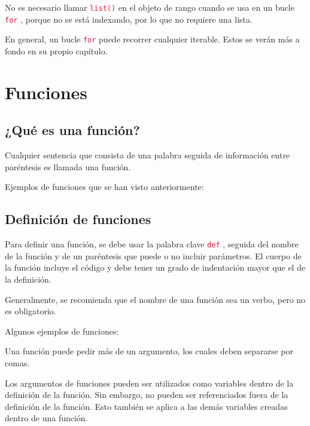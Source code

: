 \documentclass{report}
\newcommand{\ttt}[1]{
  \textcolor{Crimson}{\texttt{#1}}
}
\begin{document}
No es necesario llamar \ttt{list()} en el objeto de rango cuando se usa en un bucle \ttt{for}, porque no se está indexando, por lo que no requiere una lista.\smallskip

En general, un bucle \ttt{for} puede recorrer cualquier iterable. Estos se verán más a fondo en su propio capítulo.

\clearpage\chapter{Funciones}

\section{¿Qué es una función?}

Cualquier sentencia que consista de una palabra seguida de información entre paréntesis es llamada una función.\smallskip

Ejemplos de funciones que se han visto anteriormente:


\section{Definición de funciones}

Para definir una función, se debe usar la palabra clave \ttt{def}, seguida del nombre de la función y de un paréntesis que puede o no incluir parámetros. El cuerpo de la función incluye el código y debe tener un grado de indentación mayor que el de la definición.\smallskip

Generalmente, se recomienda que el nombre de una función sea un verbo, pero no es obligatorio.\smallskip

Algunos ejemplos de funciones:



Una función puede pedir más de un argumento, los cuales deben separarse por comas.



Los argumentos de funciones pueden ser utilizados como variables dentro de la definición de la función. Sin embargo, no pueden ser referenciados fuera de la definición de la función. Esto también se aplica a las demás variables creadas dentro de una función.
\end{document}
